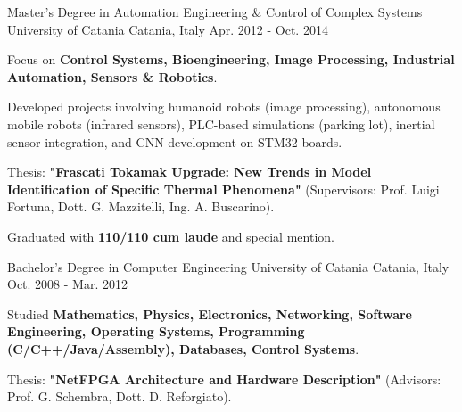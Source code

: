
\begin{cventries}

  \cventry
    {Master’s Degree in Automation Engineering \& Control of Complex Systems} %
    {University of Catania} %
    {Catania, Italy} %
    {Apr. 2012 - Oct. 2014} %
    {
      \begin{cvitems}
        \item {Focus on \textbf{Control Systems, Bioengineering, Image Processing, Industrial Automation, Sensors \& Robotics}.}
        \item {Developed projects involving humanoid robots (image processing), autonomous mobile robots (infrared sensors), PLC-based simulations (parking lot), inertial sensor integration, and CNN development on STM32 boards.}
        \item {Thesis: \textbf{"Frascati Tokamak Upgrade: New Trends in Model Identification of Specific Thermal Phenomena"} (Supervisors: Prof. Luigi Fortuna, Dott. G. Mazzitelli, Ing. A. Buscarino).}
        \item {Graduated with \textbf{110/110 cum laude} and special mention.}
      \end{cvitems}
    }

  \cventry
    {Bachelor’s Degree in Computer Engineering} %
    {University of Catania} %
    {Catania, Italy} %
    {Oct. 2008 - Mar. 2012} %
    {
      \begin{cvitems}
        \item {Studied \textbf{Mathematics, Physics, Electronics, Networking, Software Engineering, Operating Systems, Programming (C/C++/Java/Assembly), Databases, Control Systems}.}
        \item {Thesis: \textbf{"NetFPGA Architecture and Hardware Description"} (Advisors: Prof. G. Schembra, Dott. D. Reforgiato).}
      \end{cvitems}
    }

\end{cventries}
